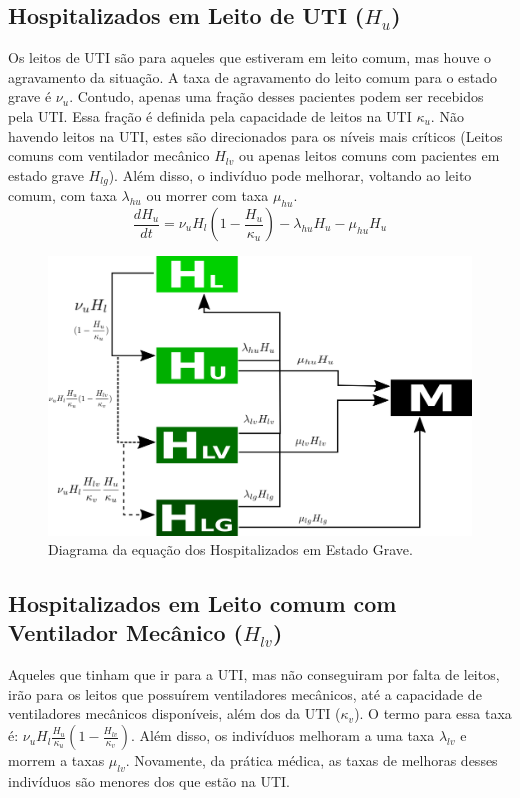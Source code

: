 \documentclass{article}
\begin{document}
\subsection{Hospitalizados em Leito de UTI ($H_u$)}
Os leitos de UTI são para aqueles que estiveram em leito comum, mas houve o agravamento da situação. A taxa de agravamento do leito comum para o estado grave é $\nu_u$. Contudo, apenas uma fração desses pacientes podem ser recebidos pela UTI. Essa fração é definida pela capacidade de leitos na UTI $\kappa_u$. Não havendo leitos na UTI, estes são direcionados para os níveis mais críticos (Leitos comuns com ventilador mecânico $H_{lv}$ ou apenas leitos comuns com pacientes em estado grave $H_{lg}$). Além disso, o indivíduo pode melhorar, voltando ao leito comum, com taxa $\lambda_{hu}$ ou morrer com taxa $\mu_{hu}$.
\begin{equation}
    \frac{dH_u}{dt}=\nu_u H_l(1 - \frac{H_u}{\kappa_{u}}) -\lambda_{hu} H_u -\mu_{hu} H_u
\end{equation}
\begin{figure}[!h]
\centering
\includegraphics[scale=0.4]{covidHu}
\caption{Diagrama da equação dos Hospitalizados em Estado Grave.}
\label{fig:universe}
\end{figure}


\subsection{Hospitalizados em Leito comum com Ventilador Mecânico ($H_{lv}$)}
Aqueles que tinham que ir para a UTI, mas não conseguiram por falta de leitos, irão para os leitos que possuírem ventiladores mecânicos, até a capacidade de ventiladores mecânicos disponíveis, além dos da UTI ($\kappa_v$). O termo para essa taxa é: $\nu_u H_l \frac{H_u}{\kappa_{u}}(1-\frac{H_{lv}}{\kappa_{v}})$. Além disso, os indivíduos melhoram a uma taxa $\lambda_{lv}$ e morrem a taxas $\mu_{lv}$. Novamente, da prática médica, as taxas de melhoras desses indivíduos são menores dos que estão na UTI.
\end{document}

